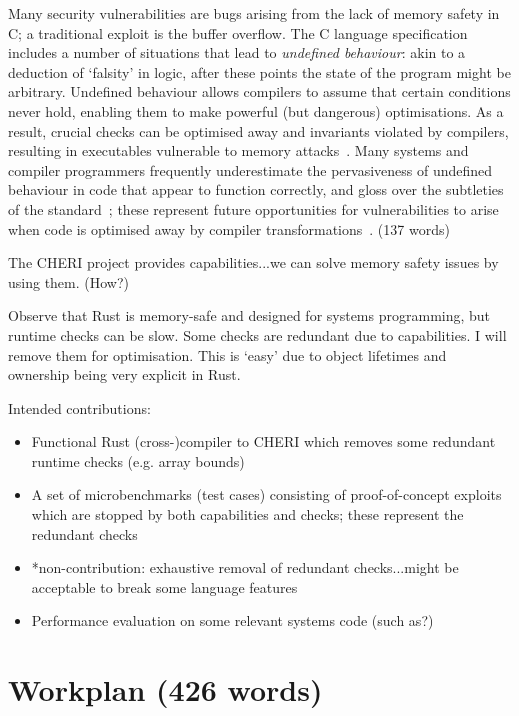 \documentclass[11pt]{article}
\begin{document}
Many security vulnerabilities are bugs arising from the lack of memory safety in C; a traditional exploit is the buffer overflow.
The C language specification includes a number of situations that lead to \emph{undefined behaviour}: akin to a deduction of `falsity' in logic, after these points the state of the program might be arbitrary.
Undefined behaviour allows compilers to assume that certain conditions never hold, enabling them to make powerful (but dangerous) optimisations.
As a result, crucial checks can be optimised away and invariants violated by compilers, resulting in executables vulnerable to memory attacks~\cite{simon2018wygiwyc}.
Many systems and compiler programmers frequently underestimate the pervasiveness of undefined behaviour in code that appear to function correctly, and gloss over the subtleties of the standard~\cite{memarian2016cdepths};
these represent future opportunities for vulnerabilities to arise when code is optimised away by compiler transformations~\cite{wang2013towards}.
(137 words)

The CHERI project provides capabilities...we can solve memory safety issues by using them. (How?)

Observe that Rust is memory-safe and designed for systems programming, but runtime checks can be slow.
Some checks are redundant due to capabilities.
I will remove them for optimisation.
This is `easy' due to object lifetimes and ownership being very explicit in Rust.

Intended contributions:
\begin{itemize}
  \item Functional Rust (cross-)compiler to CHERI which removes some redundant runtime checks (e.g. array bounds)
  \item A set of microbenchmarks (test cases) consisting of proof-of-concept exploits which are stopped by both capabilities and checks; these represent the redundant checks
  \item *non-contribution: exhaustive removal of redundant checks...might be acceptable to break some language features
  \item Performance evaluation on some relevant systems code (such as?)
\end{itemize}

\section{Workplan (426 words)}
\end{document}
